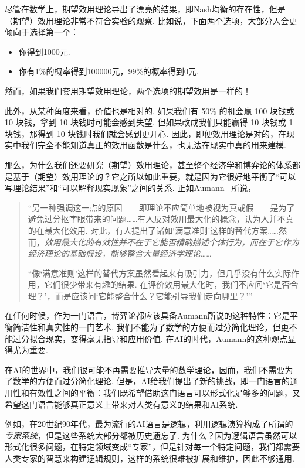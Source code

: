 尽管在数学上，期望效用理论导出了漂亮的结果，即Nash均衡的存在性，但是（期望）效用理论非常不符合实验的观察. 比如说，下面两个选项，大部分人会更倾向于选择第一个：
\begin{itemize}
    \item 你得到1000元.
    \item 你有1\%的概率得到100000元，99\%的概率得到0元.
\end{itemize}
然而，如果我们套用期望效用理论，两个选项的期望效用是一样的！

此外，从某种角度来看，价值也是相对的. 如果我们有 50\% 的机会赢 100 块钱或 10 块钱，拿到 10 块钱时可能会感到失望. 但如果改成我们只能赢得 10 块钱或 1 块钱，那得到 10 块钱时我们就会感到更开心. 因此，即便效用理论是对的，在现实中我们完全不能知道真正的效用函数是什么，也无法在现实中真的用来建模.

那么，为什么我们还要研究（期望）效用理论，甚至整个经济学和博弈论的体系都是基于（期望）效用理论的？它之所以如此重要，就是因为它很好地平衡了“可以写理论结果”和“可以解释现实现象”之间的关系. 正如Aumann~\cite{aumannWhatGameTheory1985} 所说，

\begin{quotation}
    “另一种强调这一点的原因——即理论不应简单地被视为真或假——是为了避免过分抠字眼带来的问题……有人反对效用最大化的概念，认为人并不真的在最大化效用. 对此，有人提出了诸如‘满意准则’这样的替代方案……然而，\textit{效用最大化的有效性并不在于它能否精确描述个体行为，而在于它作为经济理论的基础假设，能够整合大量经济学理论}……

    “像‘满意准则’这样的替代方案虽然看起来有吸引力，但几乎没有什么实际作用，它们很少带来有趣的结果. 在评价效用最大化时，我们不应问‘它是否合理？’，而是应该问‘它能整合什么？它能引导我们走向哪里？’”
\end{quotation}

在任何时候，作为一门语言，博弈论都应该具备Aumann所说的这种特性：它是平衡简洁性和真实性的一门艺术. 我们不能为了数学的方便而过分简化理论，但更不能过分拟合现实，变得毫无指导和应用价值. 在AI的时代，Aumann的这种观点显得尤为重要. 

在AI的世界中，我们很可能不再需要推导大量的数学理论，因而，我们不需要为了数学的方便而过分简化理论. 但是，AI给我们提出了新的挑战，即一门语言的通用性和有效性之间的平衡：我们既希望借助这门语言可以形式化足够多的问题，又希望这门语言能够真正意义上带来对人类有意义的结果和AI系统. 

例如，在20世纪90年代，最为流行的AI语言是逻辑，利用逻辑演算构成了所谓的\textit{专家系统}，但是这些系统大部分都被历史遗忘了. 为什么？因为逻辑语言虽然可以形式化很多问题，在特定领域变成“专家”，但是针对每一个特定问题，我们都需要人类专家的智慧来构建逻辑规则，这样的系统很难被扩展和维护，因此不够通用. 

